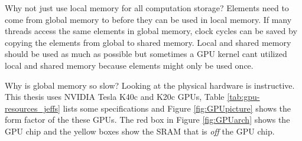 Why not just use local memory for all computation storage?
Elements need to come from global memory to before they can be used in local memory.
If many threads access the same elements in global memory, clock cycles can be saved by copying the elements from global to shared memory.
Local and shared memory should be used as much as possible but sometimes a GPU kernel cant utilized local and shared memory because elements might only be used once.


Why is global memory so slow?
Looking at the physical hardware is instructive.
This thesis uses NVIDIA Tesla K40c and K20c GPUs, Table \ref{tab:gpu-resources_jeffs} lists some specifications and Figure \ref{fig:GPUpicture} shows the form factor of the these GPUs.
The red box in Figure \ref{fig:GPUarch} shows the GPU chip and the yellow boxes show the SRAM that is \textit{off} the GPU chip.

